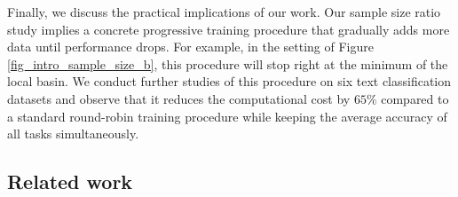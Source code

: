 Finally, we discuss the practical implications of our work.
Our sample size ratio study implies a concrete progressive training procedure that gradually adds more data until performance drops.
For example, in the setting of Figure \ref{fig_intro_sample_size_b}, this procedure will stop right at the minimum of the local basin.
We conduct further studies of this procedure on six text classification datasets and observe that it reduces the computational cost by $65\%$ compared to a standard round-robin training procedure while keeping the average accuracy of all tasks simultaneously.




\subsection{Related work}\label{sec_related}

